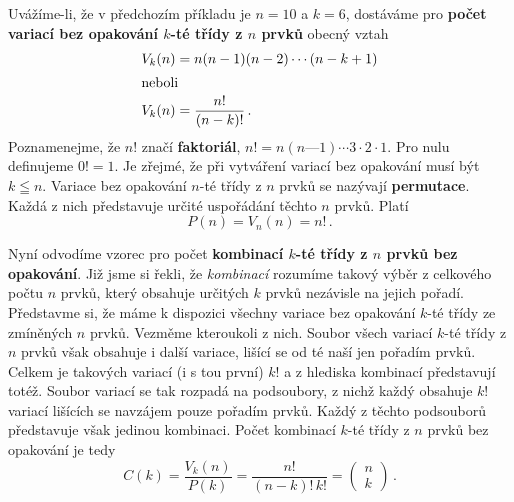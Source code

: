       
      
      Uvážíme-li, že v předchozím příkladu je \(n = 10\) a \(k = 6\), dostáváme pro \textbf{počet 
      variací bez opakování \(k\)-té třídy z \(n\) prvků} obecný vztah
      \begin{align}
        V_k(n) &= n(n-1)(n-2)\cdots(n-k+1)  \nonumber \\
        \shortintertext{neboli}
        V_k(n) &= \frac{n!}{(n-k)!}\, .    \label{mai:eq008}
      \end{align}
      Poznamenejme, že \(n!\) značí \textbf{faktoriál}, \(n! = n(n — 1)\cdots 3 \cdot 2 \cdot 1\). 
      Pro nulu definujeme \(0! = 1\). Je zřejmé, že při vytváření variací bez opakování musí být 
      \(k\leqq n\). Variace bez opakování \(n\)-té třídy z \(n\) prvků se nazývají 
      \textbf{permutace}. Každá z nich představuje určité uspořádání těchto \(n\) prvků. Platí
      \begin{equation}\label{mai:eq009}
        \boxed{P(n) = V_n(n) = n!}\, .
      \end{equation}
      
      Nyní odvodíme vzorec pro počet \textbf{kombinací \(k\)-té třídy z \(n\) prvků bez opakování}. 
      Již jsme si řekli, že \emph{kombinací} rozumíme takový výběr z celkového počtu \(n\) prvků, 
      který obsahuje určitých \(k\) prvků nezávisle na jejich pořadí. Představme si, že máme k 
      dispozici všechny variace bez opakování \(k\)-té třídy ze zmíněných \(n\) prvků. Vezměme 
      kteroukoli z nich. Soubor všech variací \(k\)-té třídy z \(n\) prvků však obsahuje i další 
      variace, lišící se od té naší jen pořadím prvků. Celkem je takových variací (i s tou první) 
      \(k!\) a z hlediska kombinací představují totéž. Soubor variací se tak rozpadá na podsoubory, 
      z nichž každý obsahuje \(k!\) variací lišících se navzájem pouze pořadím prvků. Každý z 
      těchto podsouborů představuje však jedinou kombinaci. Počet kombinací \(k\)-té třídy z \(n\) 
      prvků bez opakování je tedy
      \begin{equation}\label{mai:eq010}
        \boxed{C(k) = \frac{V_k(n)}{P(k)} = \frac{n!}{(n-k)!\,k!} = 
               \begin{pmatrix}
                n \\
                k
               \end{pmatrix}}\, .
      \end{equation}
      
